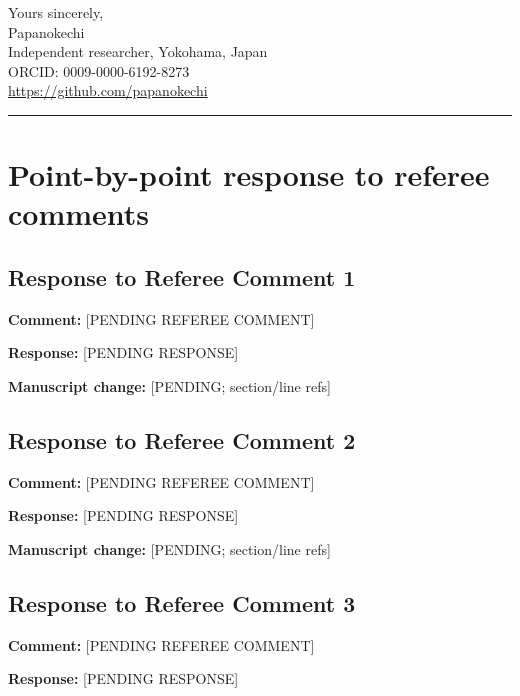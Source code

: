 \documentclass[11pt]{amsart}
\begin{document}
\medskip

\noindent
Yours sincerely,\\[0.6em]
Papanokechi\\
Independent researcher, Yokohama, Japan\\
ORCID: 0009-0000-6192-8273\\
\url{https://github.com/papanokechi}

\bigskip
\hrule
\bigskip

\section*{Point-by-point response to referee comments}

\subsection*{Response to Referee Comment 1}
\textbf{Comment:} [PENDING REFEREE COMMENT]

\medskip

\noindent\textbf{Response:} [PENDING RESPONSE]

\medskip

\noindent\textbf{Manuscript change:} [PENDING; section/line refs]

\bigskip

\subsection*{Response to Referee Comment 2}
\textbf{Comment:} [PENDING REFEREE COMMENT]

\medskip

\noindent\textbf{Response:} [PENDING RESPONSE]

\medskip

\noindent\textbf{Manuscript change:} [PENDING; section/line refs]

\bigskip

\subsection*{Response to Referee Comment 3}
\textbf{Comment:} [PENDING REFEREE COMMENT]

\medskip

\noindent\textbf{Response:} [PENDING RESPONSE]

\medskip
\end{document}
